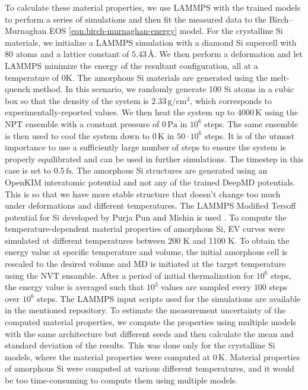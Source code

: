 To calculate these material properties, we use LAMMPS with the trained models
to perform a series of simulations and then fit the measured data to the
Birch--Murnaghan EOS \eqref{eqn:birch-murnaghan-energy} model. For the
crystalline Si materials, we initialize a LAMMPS simulation with a diamond Si
supercell with 80 atoms and a lattice constant of $5.43 \, \mathrm{Å}$. We
then perform a deformation and let LAMMPS minimize the energy of the resultant
configuration, all at a temperature of 0K. The amorphous Si materials are
generated using the melt-quench method. In this scenario, we randomly generate
100 Si atoms in a cubic box so that the density of the system is
$2.33 \, \mathrm{g/cm^3}$, which corresponds to experimentally-reported
values. We then heat the system up to
$4000 \, \mathrm{K}$ using the NPT ensemble with a constant pressure of
$0 \, \mathrm{Pa}$ in $10^{6}$ steps. The same ensemble is then used
to cool the system down to $0 \, \mathrm{K}$ in $50 \cdot 10^{6}$ steps. It is
of the utmost importance to use a sufficiently large number of steps to ensure
the system is properly equilibrated and can be used in further simulations.
The timestep in this case is set to $0.5 \, \mathrm{fs}$. The amorphous Si
structures are generated using an OpenKIM interatomic potential and not any of
the trained DeepMD potentials. This is so that we have more stable structure
that doesn't change too much under deformations and different temperatures.
The LAMMPS Modified Tersoff potential for Si developed by Purja Pun and Mishin
is used \cite{OpenKIM-SM:184524061456:000}.
To compute the temperature-dependent material properties of amorphous Si, EV
curves were simulated at different temperatures between 200 K and 1100 K. To
obtain the energy value at specific temperature and volume, the initial
amorphous cell is rescaled to the desired volume and MD is initiated at the
target temperature using the NVT ensamble. After a period of initial
thermalization for $10^6$ steps, the energy value is averaged such that $10^3$
values are sampled every $100$ steps over $10^6$ steps. The LAMMPS input
scripts used for the simulations are available in the mentioned repository.
To estimate the measurement uncertainty of the computed material properties,
we compute the properties using multiple models with the same architecture
but different seeds and then calculate the mean and standard deviation of the
results. This was done only for the crystalline Si models, where the material
properties were computed at $0 \, \mathrm{K}$. Material properties of
amorphous Si were computed at various different temperatures, and it would be
too time-consuming to compute them using multiple models.
